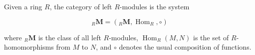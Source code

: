 Given a ring $R$, the category of left $R$-modules is the system

$$_R\mathbf{M} = (_R\mathbf{M}, \operatorname{Hom}_R, \circ)$$

where $_R\mathbf{M}$ is the class of all left $R$-modules, $\operatorname{Hom}_R(M, N)$ is the set of $R$-homomorphisms from $M$ to $N$, and $\circ$ denotes the usual composition of functions.
